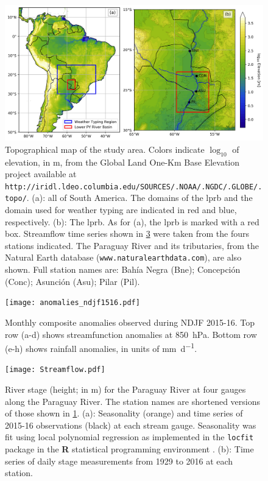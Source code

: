 \documentclass{ametsoc}
\begin{document}
\begin{figure}
	\noindent\includegraphics[width=6.5in]{study_area.jpg}
	\caption{
		Topographical map of the study area.
		Colors indicate $\log_{10}$ of elevation, in \si{\meter}, from the Global Land One-Km Base Elevation project available at \texttt{http://iridl.ldeo.columbia.edu/SOURCES/.NOAA/.NGDC/.GLOBE/.topo/}.
		(a): all of South America.
		The domains of the \acrlong{lprb} and the domain used for weather typing are indicated in red and blue, respectively.
		(b): The \acrfull{lprb}.
		As for (a), the \gls{lprb} is marked with a red box.
		Streamflow time series shown in \cref{fig:streamflow} were taken from the fours stations indicated.
		The Paraguay River and its tributaries, from the Natural Earth database (\texttt{www.naturalearthdata.com}), are also shown.
		Full station names are: Bah\'ia Negra (Bne); Concepci\'on (Conc); Asunci\'on (Asu); Pilar (Pil).
	}\label{fig:study-area}
\end{figure}

\begin{figure}
	\noindent\texttt{[image: anomalies\_ndjf1516.pdf]}
	\caption{
		Monthly composite anomalies observed during NDJF 2015-16.
		Top row (a-d) shows streamfunction anomalies at \SI{850}{\hecto\pascal}.
		Bottom row (e-h) shows rainfall anomalies, in units of \si{\milli\meter\per\day}.
	}\label{fig:anomalies}
\end{figure}

\begin{figure}
	\noindent\texttt{[image: Streamflow.pdf]}
	\caption{
		River stage (height; in \si{\meter}) for the Paraguay River at four gauges along the Paraguay River.
		The station names are shortened versions of those shown in \cref{fig:study-area}.
		(a): Seasonality (orange) and time series of 2015-16 observations (black) at each stream gauge.
		Seasonality was fit using local polynomial regression as implemented in the \texttt{locfit} package in the \textbf{R} statistical programming environment \citep{Loader1999}.
		(b): Time series of daily stage measurements from 1929 to 2016 at each station.
	}\label{fig:streamflow}
\end{figure}
\end{document}
